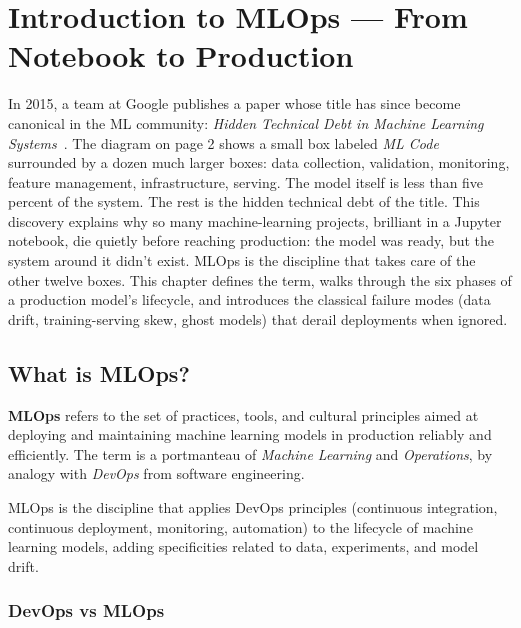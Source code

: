 \chapter{Introduction to MLOps --- From Notebook to Production}
\label{ch:introduction}

In 2015, a team at Google publishes a paper whose title has since become canonical in the ML community: \emph{Hidden Technical Debt in Machine Learning Systems}~\cite{sculley2015}. The diagram on page 2 shows a small box labeled \emph{ML Code} surrounded by a dozen much larger boxes: data collection, validation, monitoring, feature management, infrastructure, serving. The model itself is less than five percent of the system. The rest is the hidden technical debt of the title. This discovery explains why so many machine-learning projects, brilliant in a Jupyter notebook, die quietly before reaching production: the model was ready, but the system around it didn't exist. MLOps is the discipline that takes care of the other twelve boxes. This chapter defines the term, walks through the six phases of a production model's lifecycle, and introduces the classical failure modes (data drift, training-serving skew, ghost models) that derail deployments when ignored.

\section{What is MLOps?}
\label{sec:mlops-definition}

\textbf{MLOps} refers to the set of practices, tools, and
cultural principles aimed at deploying and maintaining machine learning
models in production reliably and efficiently. The term is a portmanteau
of \emph{Machine Learning} and \emph{Operations}, by analogy with
\emph{DevOps} from software engineering.

\begin{definition}[MLOps]
MLOps is the discipline that applies DevOps principles (continuous
integration, continuous deployment, monitoring, automation) to the lifecycle
of machine learning models, adding specificities related to data,
experiments, and model drift.
\end{definition}

\subsection{DevOps vs MLOps}

